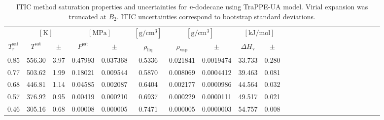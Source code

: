 \documentclass[5p,times]{elsarticle}
\begin{document}


\begin{table}[]
\centering
\caption{ITIC method saturation properties and uncertainties for \textit{n}-dodecane using TraPPE-UA model. Virial expansion was truncated at $B_2$. ITIC uncertainties correspond to bootstrap standard deviations.}
\label{tab:EXAMPLE-SIM/TraPPE-C12}
\begin{tabular}{cccccccccccccccccccccccc}
 & \multicolumn{2}{c}{$[\mathrm{K}]$} &	 \multicolumn{2}{c}{$[\mathrm{MPa}]$} & $[\mathrm{g/cm^3}]$ & \multicolumn{2}{c}{$[\mathrm{g/cm^3}]$} & \multicolumn{2}{c}{$[\mathrm{kJ/mol}]$} \\
$T_r^{\mathrm{sat}}$ & $T^{\mathrm{sat}}$ & $\pm$ & $P^{\mathrm{sat}}$ & $\pm$ & $\rho_{\mathrm{liq}}$ & $\rho_{\mathrm{vap}}$ & $\pm$ & $\Delta H_{\mathrm{v}}$ & $\pm$
 \\
\hline													
0.85	&	556.30	&	3.97	&	0.47993	&	0.037368	&	0.5336	&	0.021841	&	0.0019474	&	33.733	&	0.280	\\
0.77	&	503.62	&	1.99	&	0.18021	&	0.009544	&	0.5870	&	0.008069	&	0.0004412	&	39.463	&	0.081	\\
0.68	&	446.81	&	1.14	&	0.04585	&	0.002087	&	0.6404	&	0.002177	&	0.0000986	&	44.564	&	0.032	\\
0.57	&	376.92	&	0.95	&	0.00419	&	0.000210	&	0.6937	&	0.000229	&	0.0000111	&	49.517	&	0.021	\\
0.46	&	305.16	&	0.68	&	0.00008	&	0.000005	&	0.7471	&	0.000005	&	0.0000003	&	54.757	&	0.008	\\				
\end{tabular}

\end{table}
\end{document}
